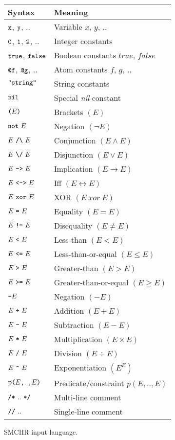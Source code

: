 \documentclass{article}
\begin{document}
\begin{figure}
\begin{center}
\begin{tabular}{|l|l|}
\hline
Syntax & Meaning \\
\hline
\hline
$\verb+x+$, $\verb+y+$, $..$ & Variable $x$, $y$, $..$ \\
$\verb+0+$, $\verb+1+$, $\verb+2+$, $..$ & Integer constants \\
$\verb+true+$, $\verb+false+$ & Boolean constants $\mathit{true}$,
    $\mathit{false}$ \\
$\verb+@f+$, $\verb+@g+$, $..$ & Atom constants $f$, $g$, $..$ \\
$\verb+"string"+$ & String constants \\
$\verb+nil+$ & Special \emph{nil} constant \\
\hline
$\verb+(+ E \verb+)+$ & Brackets $(E)$ \\
\hline
$\verb+not+~E$ & Negation $(\neg E)$ \\
$E~\verb+/\+~E$ & Conjunction $(E \wedge E)$ \\
$E~\verb+\/+~E$ & Disjunction $(E \vee E)$ \\
$E~\verb+->+~E$ & Implication $(E \rightarrow E)$ \\
$E~\verb+<->+~E$ & Iff $(E \leftrightarrow E)$ \\
$E~\verb+xor+~E$ & XOR $(E~\mathit{xor}~E)$ \\
\hline
$E~\verb+=+~E$ & Equality $(E = E)$ \\
$E~\verb+!=+~E$ & Disequality $(E \neq E)$ \\
$E~\verb+<+~E$ & Less-than $(E < E)$ \\
$E~\verb+<=+~E$ & Less-than-or-equal $(E \leq E)$ \\
$E~\verb+>+~E$ & Greater-than $(E > E)$ \\
$E~\verb+>=+~E$ & Greater-than-or-equal $(E \geq E)$ \\
\hline
$\verb+-+E$ & Negation $(-E)$ \\
$E~\verb-+-~E$ & Addition $(E + E)$ \\
$E~\verb+-+~E$ & Subtraction $(E - E)$ \\
$E~\verb+*+~E$ & Multiplication $(E \times E)$ \\
$E~\verb+/+~E$ & Division $(E \div E)$ \\
$E~\verb+^+~E$ & Exponentiation $(E^E)$ \\
\hline
$\verb+p(+E\verb+,+ ..\verb+,+E\verb+)+$ & Predicate/constraint
    $p(E, .., E)$ \\
\hline
$\verb+/*+~..~\verb+*/+$ & Multi-line comment \\
$\verb+//+~..$ & Single-line comment \\
\hline
\end{tabular}
\caption{SMCHR input language.\label{fig:syntax}}
\end{center}
\end{figure}
\end{document}
